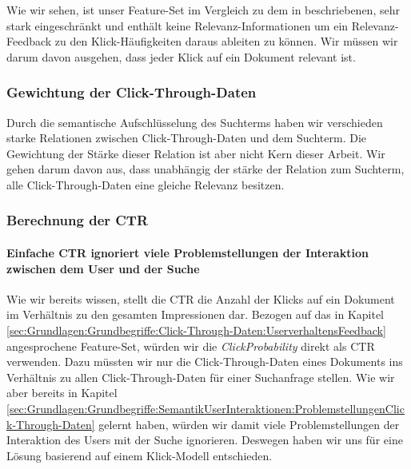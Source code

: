 Wie wir sehen, ist unser Feature-Set im Vergleich zu dem in \cite{IWUSBI} beschriebenen, sehr stark eingeschränkt und enthält keine Relevanz-Informationen um ein Relevanz-Feedback zu den Klick-Häufigkeiten daraus ableiten zu können. Wir müssen wir darum davon ausgehen, dass jeder Klick auf ein Dokument relevant ist.

\subsubsection{Gewichtung der Click-Through-Daten}
\label{sec:Reranking:Methodik:Click-Through-Daten:Gewichtung}

Durch die semantische Aufschlüsselung des Suchterms haben wir verschieden starke Relationen zwischen Click-Through-Daten und dem Suchterm. Die Gewichtung der Stärke dieser Relation ist aber nicht Kern dieser Arbeit. Wir gehen darum davon aus, dass unabhängig der stärke der Relation zum Suchterm, alle Click-Through-Daten eine gleiche Relevanz besitzen.

\subsubsection{Berechnung der CTR}
\label{sec:Reranking:Methodik:Click-Through-Daten:Gewichtung}

\paragraph{Einfache CTR ignoriert viele Problemstellungen der Interaktion zwischen dem User und der Suche} 
Wie wir bereits wissen, stellt die CTR die Anzahl der Klicks auf ein Dokument im Verhältnis zu den gesamten Impressionen dar. Bezogen auf das in Kapitel \ref{sec:Grundlagen:Grundbegriffe:Click-Through-Daten:UserverhaltensFeedback} angesprochene Feature-Set, würden wir die \textit{ClickProbability} direkt als CTR verwenden. Dazu müssten wir nur die Click-Through-Daten eines Dokuments ins Verhältnis zu allen Click-Through-Daten für einer Suchanfrage stellen. Wie wir aber bereits in Kapitel \ref{sec:Grundlagen:Grundbegriffe:SemantikUserInteraktionen:ProblemstellungenClick-Through-Daten} gelernt haben, würden wir damit viele Problemstellungen der Interaktion des Users mit der Suche ignorieren. Deswegen haben wir uns für eine Lösung basierend auf einem Klick-Modell entschieden. 

